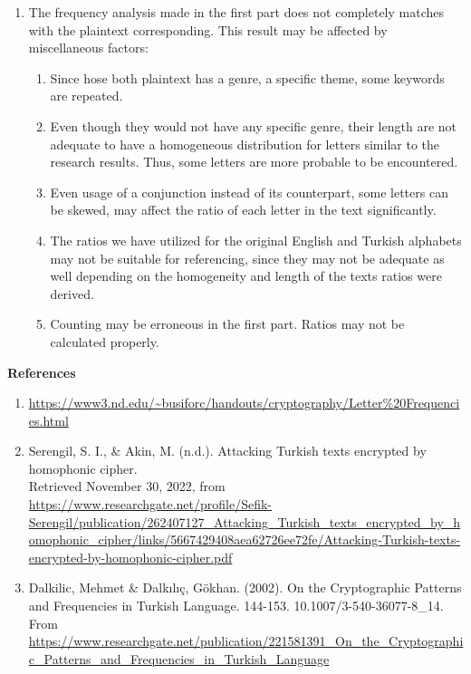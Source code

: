 \documentclass[12pt,a4paper, margin=1in]{article}
\begin{document}
\begin{enumerate}
\begin{enumerate}
            \item
            The frequency analysis made in the first part does not completely matches with the plaintext corresponding. This result may be affected by miscellaneous factors:
            \begin{enumerate}
                \item 
                Since hose both plaintext has a genre, a specific theme, some keywords are repeated.\\
                \item
                Even though they would not have any specific genre, their length are not adequate to have a homogeneous distribution for letters similar to the research results. Thus, some letters are more probable to be encountered.
                \item
                Even usage of a conjunction instead of its counterpart, some letters can be skewed, may affect the ratio of each letter in the text significantly.
                \item
                The ratios we have utilized for the original English and Turkish alphabets may not be suitable for referencing, since they may not be adequate as well depending on the homogeneity and length of the texts ratios were derived.
                \item
                Counting may be erroneous in the first part. Ratios may not be calculated properly.
            \end{enumerate}
        \end{enumerate}

\end{enumerate}

\newpage
\textbf{References}
\begin{enumerate}
    \item 
    \url{https://www3.nd.edu/~busiforc/handouts/cryptography/Letter\%20Frequencies.html}
    \item
    Serengil, S. I., \& Akin, M. (n.d.). Attacking Turkish texts encrypted by homophonic cipher.\\ Retrieved November 30, 2022, from \url{https://www.researchgate.net/profile/Sefik-Serengil/publication/262407127_Attacking_Turkish_texts_encrypted_by_homophonic_cipher/links/5667429408aea62726ee72fe/Attacking-Turkish-texts-encrypted-by-homophonic-cipher.pdf}
    \item
    Dalkilic, Mehmet \& Dalkılıç, Gökhan. (2002). On the Cryptographic Patterns and Frequencies in Turkish Language. 144-153. 10.1007/3-540-36077-8\_14. From \url{https://www.researchgate.net/publication/221581391_On_the_Cryptographic_Patterns_and_Frequencies_in_Turkish_Language}
\end{enumerate}
\end{document}
